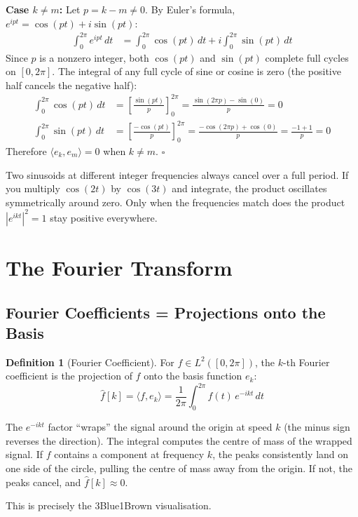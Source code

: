 \documentclass[11pt,a4paper]{article}
\theoremstyle{definition}
\newtheorem{definition}{Definition}[section]
\begin{document}
\textbf{Case $k \neq m$:} Let $p = k - m \neq 0$. By Euler's formula, $e^{ipt} = \cos(pt) + i\sin(pt)$:
\begin{align}
    \int_0^{2\pi} e^{ipt} \, dt &= \int_0^{2\pi} \cos(pt) \, dt + i \int_0^{2\pi} \sin(pt) \, dt
\end{align}
Since $p$ is a nonzero integer, both $\cos(pt)$ and $\sin(pt)$ complete full cycles on $[0, 2\pi]$. The integral of any full cycle of sine or cosine is zero (the positive half cancels the negative half):
\begin{align}
    \int_0^{2\pi} \cos(pt) \, dt &= \left[\frac{\sin(pt)}{p}\right]_0^{2\pi} = \frac{\sin(2\pi p) - \sin(0)}{p} = 0 \\
    \int_0^{2\pi} \sin(pt) \, dt &= \left[\frac{-\cos(pt)}{p}\right]_0^{2\pi} = \frac{-\cos(2\pi p) + \cos(0)}{p} = \frac{-1+1}{p} = 0
\end{align}
Therefore $\langle e_k, e_m \rangle = 0$ when $k \neq m$. $\square$

\begin{intuition}
Two sinusoids at different integer frequencies always cancel over a full period. If you multiply $\cos(2t)$ by $\cos(3t)$ and integrate, the product oscillates symmetrically around zero. Only when the frequencies match does the product $|e^{ikt}|^2 = 1$ stay positive everywhere.
\end{intuition}

\section{The Fourier Transform}

\subsection{Fourier Coefficients = Projections onto the Basis}

\begin{definition}[Fourier Coefficient]
For $f \in L^2([0, 2\pi])$, the $k$-th Fourier coefficient is the projection of $f$ onto the basis function $e_k$:
\begin{equation}
    \hat{f}[k] = \langle f, e_k \rangle = \frac{1}{2\pi} \int_0^{2\pi} f(t) \, e^{-ikt} \, dt
\end{equation}
\end{definition}

\begin{intuition}
The $e^{-ikt}$ factor ``wraps'' the signal around the origin at speed $k$ (the minus sign reverses the direction). The integral computes the centre of mass of the wrapped signal. If $f$ contains a component at frequency $k$, the peaks consistently land on one side of the circle, pulling the centre of mass away from the origin. If not, the peaks cancel, and $\hat{f}[k] \approx 0$.

This is precisely the 3Blue1Brown visualisation.
\end{intuition}
\end{document}
